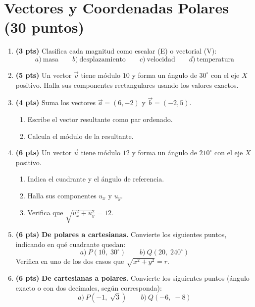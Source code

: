 \documentclass[12pt, letterpaper]{article}
\begin{document}
\newpage

\section{Vectores y Coordenadas Polares (30 puntos)}

\begin{enumerate}[leftmargin=*]
  \item \textbf{(3 pts)} Clasifica cada magnitud como escalar (E) o vectorial (V):
        \[
          a)\ \text{masa} \qquad b)\ \text{desplazamiento} \qquad c)\ \text{velocidad} \qquad d)\ \text{temperatura}
        \]

  \item \textbf{(5 pts)} Un vector $\vec{v}$ tiene módulo $10$ y forma un ángulo de $30^{\circ}$ con el eje $X$ positivo. Halla sus componentes rectangulares usando los valores exactos.

  \item \textbf{(4 pts)} Suma los vectores $\vec{a} = (6, -2)$ y $\vec{b} = (-2, 5)$.
        \begin{enumerate}[label=\alph*)]
          \item Escribe el vector resultante como par ordenado.
          \item Calcula el módulo de la resultante.
        \end{enumerate}

  \item \textbf{(6 pts)} Un vector $\vec{u}$ tiene módulo $12$ y forma un ángulo de $210^{\circ}$ con el eje $X$ positivo.
        \begin{enumerate}[label=\alph*)]
          \item Indica el cuadrante y el ángulo de referencia.
          \item Halla sus componentes $u_x$ y $u_y$.
          \item Verifica que $\sqrt{u_x^2 + u_y^2} = 12$.
        \end{enumerate}

  \item \textbf{(6 pts)} \textbf{De polares a cartesianas.} Convierte los siguientes puntos, indicando en qué cuadrante quedan:
        \[
          a)\ P(10,\; 30^{\circ}) \qquad b)\ Q(20,\; 240^{\circ})
        \]
        Verifica en uno de los dos casos que $\sqrt{x^2 + y^2} = r$.

  \item \textbf{(6 pts)} \textbf{De cartesianas a polares.} Convierte los siguientes puntos (ángulo exacto o con dos decimales, según corresponda):
        \[
          a)\ P(-1,\; \sqrt{3}) \qquad b)\ Q(-6,\; -8)
        \]
\end{enumerate}
\end{document}
